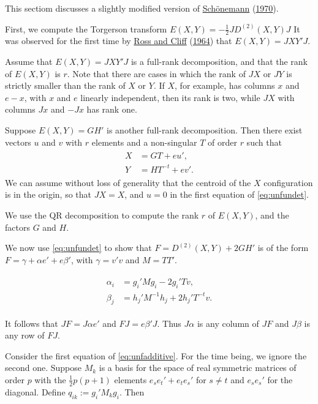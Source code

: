 \documentclass[
  12pt,
]{book}
\theoremstyle{definition}
\theoremstyle{definition}
\theoremstyle{definition}
\theoremstyle{definition}
\theoremstyle{remark}
\begin{document}
This sectiom discusses a slightly modified version of \protect\hyperlink{ref-schoenemann_70}{Schönemann} (\protect\hyperlink{ref-schoenemann_70}{1970}).

First, we compute the Torgerson transform \(E(X,Y)=-\frac12 JD^{(2)}(X,Y)J\) It was observed for the first time by \protect\hyperlink{ref-ross_cliff_64}{Ross and Cliff} (\protect\hyperlink{ref-ross_cliff_64}{1964}) that \(E(X,Y)=JXY'J\).

Assume that \(E(X,Y)=JXY'J\) is a full-rank decomposition, and that the rank of \(E(X,Y)\) is \(r\). Note that there are cases in which the rank of \(JX\) or \(JY\) is strictly smaller than the rank of \(X\) or \(Y\). If \(X\), for example, has columns
\(x\) and \(e-x\), with \(x\) and \(e\) linearly independent, then its rank is two, while \(JX\) with columns \(Jx\) and \(-Jx\) has rank one.

Suppose \(E(X,Y)=GH'\) is another full-rank decomposition. Then there exist vectors \(u\) and \(v\) with \(r\) elements and a non-singular \(T\) of order \(r\) such that
\begin{align}
\begin{split}
X&=GT+eu',\\
Y&=HT^{-t}+ev'.
\end{split}
\label{eq:unfundet}
\end{align}
We can assume without loss of generality that the centroid of the
\(X\) configuration is in the origin, so that \(JX=X\), and \(u=0\) in the first equation
of \eqref{eq:unfundet}.

We use the QR decomposition to compute the rank \(r\) of \(E(X,Y)\), and the factors \(G\) and \(H\).

We now use \eqref{eq:unfundet} to show that \(F=D^{(2)}(X,Y)+2GH'\) is of the
form \(F=\gamma+\alpha e'+e\beta'\), with \(\gamma=v'v\) and \(M=TT'\).

\begin{align}
\begin{split}
\alpha_i&=g_i'Mg_i-2g_i'Tv,\\
\beta_j&=h_j'M^{-1}h_j+2h_j'T^{-t}v.
\end{split}
\label{eq:unfadditive}
\end{align}

It follows that \(JF=J\alpha e'\) and \(FJ=e\beta' J\). Thus \(J\alpha\) is any column of \(JF\) and \(J\beta\) is any row of \(FJ\).

Consider the first equation of \eqref{eq:unfadditive}. For the time being, we ignore the second one. Suppose \(M_k\) is a basis for the space of real symmetric matrices of order \(p\) with the \(\frac12 p(p+1)\) elements \(e_se_t'+e_te_s'\) for \(s\not= t\) and \(e_se_s'\) for the diagonal. Define \(q_{ik}:=g_i'M_kg_i\). Then
\end{document}
